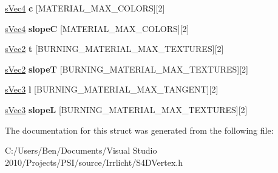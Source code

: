 \begin{DoxyCompactItemize}
\item 
\hypertarget{structirr_1_1video_1_1s_scan_convert_data_ae92afa7caba25a0e02a0f5b38ee7c9a1}{\hyperlink{structirr_1_1video_1_1s_vec4}{s\-Vec4} {\bfseries c} \mbox{[}M\-A\-T\-E\-R\-I\-A\-L\-\_\-\-M\-A\-X\-\_\-\-C\-O\-L\-O\-R\-S\mbox{]}\mbox{[}2\mbox{]}}\label{structirr_1_1video_1_1s_scan_convert_data_ae92afa7caba25a0e02a0f5b38ee7c9a1}

\item 
\hypertarget{structirr_1_1video_1_1s_scan_convert_data_ada0394a030b4c7a0c63d0ede296f4c02}{\hyperlink{structirr_1_1video_1_1s_vec4}{s\-Vec4} {\bfseries slope\-C} \mbox{[}M\-A\-T\-E\-R\-I\-A\-L\-\_\-\-M\-A\-X\-\_\-\-C\-O\-L\-O\-R\-S\mbox{]}\mbox{[}2\mbox{]}}\label{structirr_1_1video_1_1s_scan_convert_data_ada0394a030b4c7a0c63d0ede296f4c02}

\item 
\hypertarget{structirr_1_1video_1_1s_scan_convert_data_a2867c105fe8006c61c6a2acbea91e254}{\hyperlink{structirr_1_1video_1_1s_vec2}{s\-Vec2} {\bfseries t} \mbox{[}B\-U\-R\-N\-I\-N\-G\-\_\-\-M\-A\-T\-E\-R\-I\-A\-L\-\_\-\-M\-A\-X\-\_\-\-T\-E\-X\-T\-U\-R\-E\-S\mbox{]}\mbox{[}2\mbox{]}}\label{structirr_1_1video_1_1s_scan_convert_data_a2867c105fe8006c61c6a2acbea91e254}

\item 
\hypertarget{structirr_1_1video_1_1s_scan_convert_data_a379746719940662216c86be70945264a}{\hyperlink{structirr_1_1video_1_1s_vec2}{s\-Vec2} {\bfseries slope\-T} \mbox{[}B\-U\-R\-N\-I\-N\-G\-\_\-\-M\-A\-T\-E\-R\-I\-A\-L\-\_\-\-M\-A\-X\-\_\-\-T\-E\-X\-T\-U\-R\-E\-S\mbox{]}\mbox{[}2\mbox{]}}\label{structirr_1_1video_1_1s_scan_convert_data_a379746719940662216c86be70945264a}

\item 
\hypertarget{structirr_1_1video_1_1s_scan_convert_data_a5d1f8b1da1863f484a5e9766226bb987}{\hyperlink{structirr_1_1video_1_1s_vec3}{s\-Vec3} {\bfseries l} \mbox{[}B\-U\-R\-N\-I\-N\-G\-\_\-\-M\-A\-T\-E\-R\-I\-A\-L\-\_\-\-M\-A\-X\-\_\-\-T\-A\-N\-G\-E\-N\-T\mbox{]}\mbox{[}2\mbox{]}}\label{structirr_1_1video_1_1s_scan_convert_data_a5d1f8b1da1863f484a5e9766226bb987}

\item 
\hypertarget{structirr_1_1video_1_1s_scan_convert_data_af8668325cf47e219e10d6d66d6a3c50e}{\hyperlink{structirr_1_1video_1_1s_vec3}{s\-Vec3} {\bfseries slope\-L} \mbox{[}B\-U\-R\-N\-I\-N\-G\-\_\-\-M\-A\-T\-E\-R\-I\-A\-L\-\_\-\-M\-A\-X\-\_\-\-T\-E\-X\-T\-U\-R\-E\-S\mbox{]}\mbox{[}2\mbox{]}}\label{structirr_1_1video_1_1s_scan_convert_data_af8668325cf47e219e10d6d66d6a3c50e}

\end{DoxyCompactItemize}


The documentation for this struct was generated from the following file\-:\begin{DoxyCompactItemize}
\item 
C\-:/\-Users/\-Ben/\-Documents/\-Visual Studio 2010/\-Projects/\-P\-S\-I/source/\-Irrlicht/S4\-D\-Vertex.\-h\end{DoxyCompactItemize}
